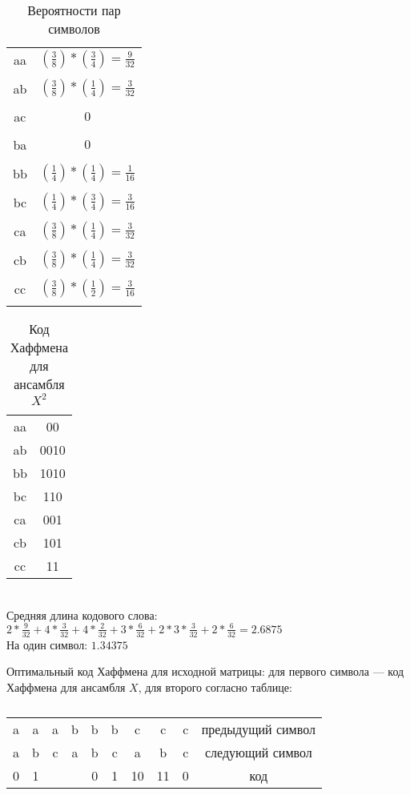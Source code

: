 \documentclass{article}
\begin{document}
\begin{table}[H]
\begin{tabular}{|c|c|}
aa & $(\frac{3}{8}) * (\frac{3}{4}) = \frac{9}{32}$\\\\
ab & $(\frac{3}{8}) * (\frac{1}{4}) = \frac{3}{32}$\\\\
ac & $0$\\\\
ba & $0$\\\\
bb & $(\frac{1}{4}) * (\frac{1}{4}) = \frac{1}{16}$\\\\
bc & $(\frac{1}{4}) * (\frac{3}{4}) = \frac{3}{16}$\\\\
ca & $(\frac{3}{8}) * (\frac{1}{4}) = \frac{3}{32}$\\\\
cb & $(\frac{3}{8}) * (\frac{1}{4}) = \frac{3}{32}$\\\\
cc & $(\frac{3}{8}) * (\frac{1}{2}) = \frac{3}{16}$\\\\
\end{tabular}
\captionsetup{singlelinecheck=off,justification=raggedright}
\caption{\label{tab:widgets}Вероятности пар символов}
\end{table}


\begin{table}[H]
\begin{tabular}{|c|c|}
aa & 00\\
ab & 0010\\
bb & 1010\\
bc & 110\\
ca & 001\\
cb & 101\\
cc & 11\\
\end{tabular}
\captionsetup{singlelinecheck=off,justification=raggedright}
\caption{\label{tab:widgets}Код Хаффмена для ансамбля $X^2$}
\end{table}
\\
Средняя длина кодового слова: $2 * \frac{9}{32} + 4 * \frac{3}{32} + 4 * \frac{2}{32} + 3 * \frac{6}{32} + 2 * 3 * \frac{3}{32} + 2 * \frac{6}{32} = 2{.}6875$\\
На один символ: $1{.}34375$

Оптимальный код Хаффмена для исходной матрицы: для первого символа — код Хаффмена для ансамбля $X$, для второго согласно таблице:
\begin{table}[H]
\begin{tabular}{|c|c|c|c|c|c|c|c|c|c|}
a & a & a & b & b & b & c & c & c & предыдущий символ\\
a & b & c & a & b & c & a & b & c & следующий символ\\
0 & 1 &   &   & 0 & 1 &10 &11 & 0 & код\\
\end{tabular}
\captionsetup{singlelinecheck=off,justification=raggedright}
\caption{\label{tab:widgets}}
\end{table}
\end{document}
